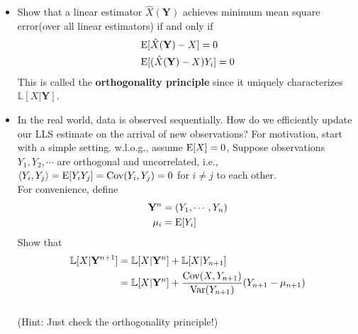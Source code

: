 \documentclass[10pt]{article}
\begin{document}
\begin{enumerate}
\begin{itemize}
\item[(b)] Show that a linear estimator \(\hat{X}(\mathbf{Y})\) achieves minimum mean square error(over all linear estimators) if and only if 
\begin{align}
    &\mathrm{E}[\hat{X}(\mathbf{Y})-X] = 0\\
    &\mathrm{E}[(\hat{X}(\mathbf{Y})-X)Y_i] = 0
\end{align}
This is called the \textbf{orthogonality principle} since it uniquely characterizes \(\mathbb{L}[X|\mathbf{Y}]\).\\
\item[(c)] In the real world, data is observed sequentially. How do we efficiently update our LLS estimate on the arrival of new observations? For motivation, start with a simple setting. w.l.o.g., assume \(\mathrm{E}[X] = 0\), Suppose observations \(Y_1,Y_2,\cdots \) are orthogonal and uncorrelated, i.e., \(\langle Y_i,Y_j\rangle=\mathrm{E}[Y_iY_j]=\mathrm{Cov}(Y_i,Y_j) = 0\) for \(i\neq j\) to each other.\\
For convenience, define
\begin{align*}
    \mathbf{Y}^n&=(Y_1,\cdots,Y_n)\\
    \mu_i  &= \mathrm{E}[Y_i]
\end{align*}
Show that
\begin{align}
     \mathbb{L}[X|\mathbf{Y}^{n+1}]&=  \mathbb{L}[X|\mathbf{Y}^n]+ \mathbb{L}[X|Y_{n+1}]\\
     &= \mathbb{L}[X|\mathbf{Y}^n]+ \frac{\mathrm{Cov}(X,Y_{n+1})}{\mathrm{Var}(Y_{n+1})}(Y_{n+1}-\mu_{n+1})
\end{align}
\\
(Hint: Just check the orthogonality principle!)
\end{itemize}

\newpage


\newpage







\end{enumerate}
\end{document}
